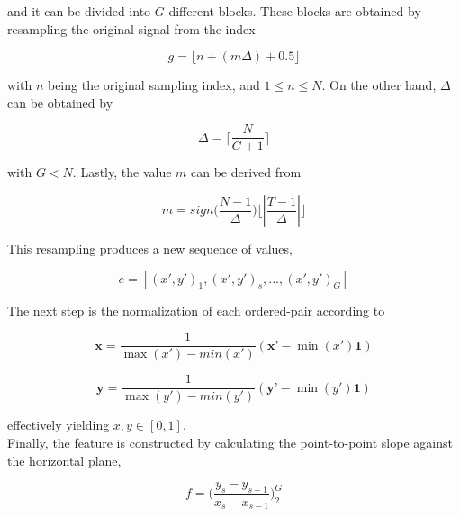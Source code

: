 \documentclass[brainsci,article,submit,moreauthors,pdftex,10pt,a4paper]{mdpi}
\begin{document}
\noindent and it can be divided into $G$ different blocks.  These blocks are obtained by resampling the original signal from the index 

\begin{equation}
g = \lfloor n + ( m \Delta ) + 0.5 \rfloor
\label{eq:shccdelta}
\end{equation}

\noindent with $n$ being the original sampling index, and $ 1 \leq n \leq N $.  On the other hand, $\Delta$ can be obtained by

\begin{equation}
\Delta = \bigg \lceil \frac{N}{G+1} \bigg \rceil
\label{eq:shccdelta}
\end{equation}

\noindent with $ G < N $. Lastly, the value $m$ can be derived from

\begin{equation}
m = sign \bigg (  \frac{N-1}{\Delta} \bigg )  \bigg \lfloor \left\lvert \frac{T-1}{\Delta} \right\lvert \bigg \rfloor
\label{eq:shccdelta}
\end{equation}

This resampling produces a new sequence of values,

\begin{equation}
e = \left[ (x',y')_{1}, (x',y')_{s}, ..., (x',y')_{G} \right]
\label{eq:shccdelta}
\end{equation}

The next step is the normalization of each ordered-pair according to

\begin{equation}
\textbf{x} = \frac{1}{\max(x') - min(x')} ( \textbf{x'} - \min(x') \textbf{1} )
\label{eq:shccdelta}
\end{equation}

\begin{equation}
\textbf{y} = \frac{1}{\max(y') - min(y')} ( \textbf{y'} - \min(y') \textbf{1} )
\label{eq:shccdelta}
\end{equation}

\noindent effectively yielding $x,y \in [0,1]$. \\

Finally, the feature is constructed by calculating the point-to-point slope against the horizontal plane,

\begin{equation}
f = \bigg (  \frac{y_{s}-y_{s-1}}{x_{s}-x_{s-1}}  \bigg )_{2}^{G} 
\label{eq:shccdelta}
\end{equation}
\end{document}
